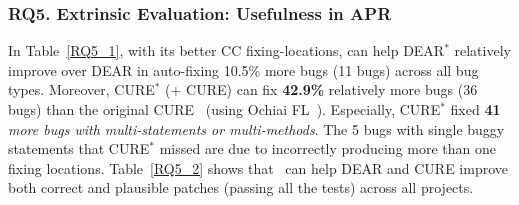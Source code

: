\subsubsection{\bf RQ5. Extrinsic Evaluation: Usefulness in APR}
In Table~\ref{RQ5_1}, with its better CC fixing-locations, {\tool} can
help DEAR$^{*}$ relatively improve over DEAR in auto-fixing 10.5\%
more bugs (11 bugs) across all bug types.
 Moreover, CURE$^{*}$ ({\tool}+ CURE) can fix {\bf 42.9\%} relatively more bugs (36 bugs) than the original CURE~\cite{cure-icse21} (using Ochiai FL~\cite{Ochiai}). 
Especially, CURE$^{*}$ fixed {\bf 41} {\em more bugs
with multi-statements or multi-methods}. 
The 5 bugs with
single buggy statements that CURE$^{*}$ missed are due to {\tool}
incorrectly producing more than one fixing locations.
Table~\ref{RQ5_2} shows that~{\tool} can help DEAR and CURE improve
both correct and plausible patches (passing all the tests) across all
projects.



